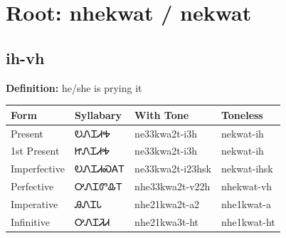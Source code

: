 \documentclass{article}%
\begin{document}
%
\normalsize%
\section*{Root: nhekwat / nekwat}%
\subsection*{ih-vh}%
\textbf{Definition: }%
he/she is prying it%
\\[0.5em]%
\begin{tabular}{|l|l|l|l|}%
\hline%
\textbf{Form}&\textbf{Syllabary}&\textbf{With Tone}&\textbf{Toneless}\\%
\hline%
Present&ᎧᏁᏆᏗᎭ&ne33kwa2t{-}i3h&nekwat{-}ih\\%
1st Present&ᏥᏁᏆᏗᎭ&ne33kwa2t{-}i3h&nekwat{-}ih\\%
Imperfective&ᎧᏁᏆᏗᏍᎪᎢ&ne33kwa2t{-}i23hsk&nekwat{-}ihsk\\%
Perfective&ᎤᏁᏆᏛᎲᎢ&nhe33kwa2t{-}v22h&nhekwat{-}vh\\%
Imperative&ᎯᏁᏆᏓ&nhe21kwa2t{-}a2&nhe1kwat{-}a\\%
Infinitive&ᎤᏁᏆᏘᏗ&nhe21kwa3t{-}ht&nhe1kwat{-}ht\\%
\hline%
\end{tabular}%
\\[1em]%
\end{document}
